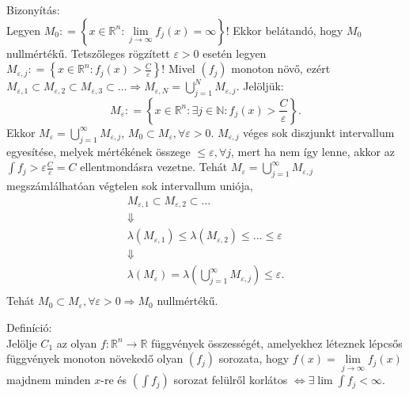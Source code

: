 \documentclass[12pt,a4paper]{scrartcl}
\newenvironment{definicio}{}{}
\newenvironment{bizonyitas}{}{}
\begin{document}
\begin{bizonyitas}

Bizonyítás:\\
Legyen
\(M_{0}: = \left\{ {x \in {\mathbb{R}}^{n}:\lim\limits_{j\rightarrow\infty}f_{j}\left( x \right) = \infty} \right\}\)!
Ekkor belátandó, hogy \(M_{0}\) nullmértékű. Tetszőleges rögzített
\(\varepsilon > 0\) esetén legyen
\(M_{\varepsilon,j}: = \left\{ {x \in {\mathbb{R}}^{n}:f_{j}\left( x \right) > \frac{C}{\varepsilon}} \right\}\)!
Mivel \(\left( f_{j} \right)\) monoton növő, ezért
\(\left. M_{\varepsilon,1} \subset M_{\varepsilon,2} \subset M_{\varepsilon,3} \subset \ldots\Rightarrow M_{\varepsilon,N} = {\bigcup\limits_{j = 1}^{N}M_{\varepsilon,j}} \right.\).
Jelöljük:
\[M_{\varepsilon}: = {\left\{ {x \in {\mathbb{R}}^{n}:\exists j \in {\mathbb{N}}:f_{j}\left( x \right) > \frac{C}{\varepsilon}} \right\}.}\]
Ekkor
\(M_{\varepsilon} = {\bigcup\limits_{j = 1}^{\infty}M_{\varepsilon,j}}\),
\(M_{0} \subset M_{\varepsilon},\forall\varepsilon > 0\).
\(M_{\varepsilon,j}\) véges sok diszjunkt intervallum egyesítése, melyek
mértékének összege \(\leq \varepsilon,\forall j\), mert ha nem így
lenne, akkor az \({\int{f_{j} > \varepsilon\frac{C}{\varepsilon}}} = C\)
ellentmondásra vezetne. Tehát
\(M_{\varepsilon} = {\bigcup\limits_{j = 1}^{\infty}M_{\varepsilon,j}}\)
megszámlálhatóan végtelen sok intervallum uniója, \[\begin{gathered}
  {M_{\varepsilon ,1}} \subset {M_{\varepsilon ,2}} \subset ... \\ 
   \Downarrow  \\ 
  \lambda \left( {{M_{\varepsilon ,1}}} \right) \leqslant \lambda \left( {{M_{\varepsilon ,2}}} \right) \leqslant ... \leqslant \varepsilon  \\ 
   \Downarrow  \\ 
  \lambda \left( {{M_\varepsilon }} \right) = \lambda \left( {\bigcup\limits_{j = 1}^\infty  {{M_{\varepsilon ,j}}} } \right) \leqslant \varepsilon . \\ 
\end{gathered} \] Tehát
\(\left. M_{0} \subset M_{\varepsilon},\forall\varepsilon > 0\Rightarrow M_{0} \right.\)
nullmértékű.

\end{bizonyitas}

\begin{definicio}

Definíció:\\
Jelölje \(C_{1}\) az olyan
\(\left. f:{\mathbb{R}}^{n}\rightarrow{\mathbb{R}} \right.\) függvények
összességét, amelyekhez léteznek lépcsős függvények monoton növekedő
olyan \(\left( f_{j} \right)\) sorozata, hogy
\(f\left( x \right) = \lim\limits_{j\rightarrow\infty}f_{j}\left( x \right)\)
majdnem minden \(x\)-re és \(\left( {\int f_{j}} \right)\) sorozat
felülről korlátos
\(\left. \Leftrightarrow\exists\lim{\int f_{j}} < \infty \right.\).

\end{definicio}
\end{document}
